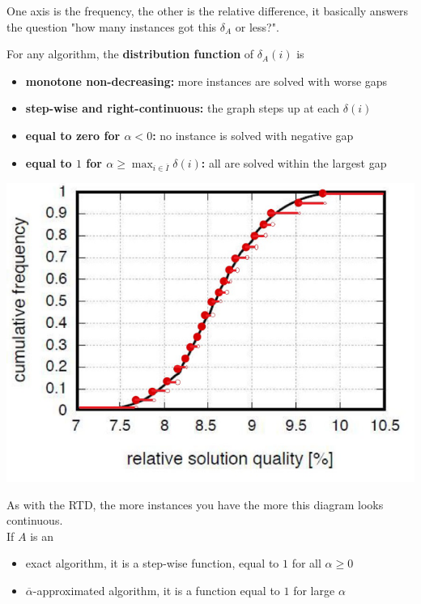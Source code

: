 One axis is the frequency, the other is the relative difference, it basically answers the question "how many instances got this $\delta_A$ or less?". \\

\newpage

For any algorithm, the \textbf{distribution function} of $\delta_A (i)$ is
\begin{itemize}
	\item \textbf{monotone non-decreasing:} more instances are solved with worse gaps
	\item \textbf{step-wise and right-continuous:} the graph steps up at each $\delta (i)$
	\item \textbf{equal to zero for $\alpha < 0$:} no instance is solved with negative gap
	\item \textbf{equal to $1$ for $\alpha \geq \max_{i \in \overline{I}} \delta (i)$:} all are solved within the largest gap
\end{itemize}
\begin{center}
	\includegraphics[width=0.7\columnwidth]{img/SQD2}
\end{center}
As with the RTD, the more instances you have the more this diagram looks continuous.\\

If $A$ is an
\begin{itemize}
	\item exact algorithm, it is a step-wise function, equal to $1$ for all $\alpha \geq 0$
	\item $\overline{\alpha}$-approximated algorithm, it is a function equal to $1$ for large $\alpha$
\end{itemize}
\nn

